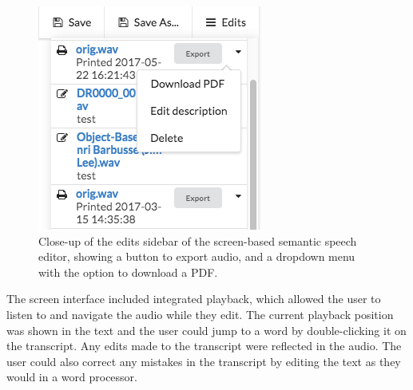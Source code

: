 \begin{figure}
  \centering
  \includegraphics[width=0.4\columnwidth]{figs/discourse-download-pdf.png}
  \caption[Close-up of the edits sidebar of the screen-based semantic speech editor.]{Close-up of the edits sidebar of
  the screen-based semantic speech editor, showing a button to export audio, and a dropdown menu with the option to
download a PDF.}
  \label{fig:download-pdf}
\end{figure}


The screen interface included integrated playback, which allowed the user to listen to and navigate the audio while
they edit. The current playback position was shown in the text and the user could jump to a word by double-clicking it
on the transcript. Any edits made to the transcript were reflected in the audio.  The user could also correct any
mistakes in the transcript by editing the text as they would in a word processor.



